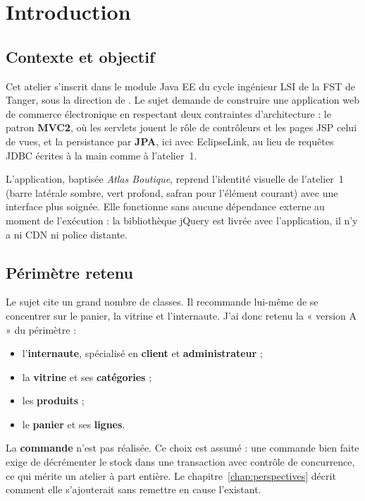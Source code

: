 \chapter{Introduction}

\section{Contexte et objectif}
Cet atelier s'inscrit dans le module Java EE du cycle ingénieur LSI de la FST de Tanger, sous la direction de
\encadrant. Le sujet demande de construire une application web de commerce électronique en respectant deux
contraintes d'architecture : le patron \textbf{MVC2}, où les servlets jouent le rôle de contrôleurs et les pages
JSP celui de vues, et la persistance par \textbf{JPA}, ici avec EclipseLink, au lieu de requêtes JDBC écrites à la main
comme à l'atelier~1.

L'application, baptisée \textit{Atlas Boutique}, reprend l'identité visuelle de l'atelier~1 (barre latérale sombre,
vert profond, safran pour l'élément courant) avec une interface plus soignée. Elle fonctionne sans aucune
dépendance externe au moment de l'exécution : la bibliothèque jQuery est livrée avec l'application, il n'y a ni
CDN ni police distante.

\section{Périmètre retenu}
Le sujet cite un grand nombre de classes. Il recommande lui-même de se concentrer sur le panier, la vitrine et
l'internaute. J'ai donc retenu la « version A » du périmètre :

\begin{itemize}
  \item l'\textbf{internaute}, spécialisé en \textbf{client} et \textbf{administrateur} ;
  \item la \textbf{vitrine} et ses \textbf{catégories} ;
  \item les \textbf{produits} ;
  \item le \textbf{panier} et ses \textbf{lignes}.
\end{itemize}

La \textbf{commande} n'est pas réalisée. Ce choix est assumé : une commande bien faite exige de décrémenter le
stock dans une transaction avec contrôle de concurrence, ce qui mérite un atelier à part entière. Le
chapitre~\ref{chap:perspectives} décrit comment elle s'ajouterait sans remettre en cause l'existant.

